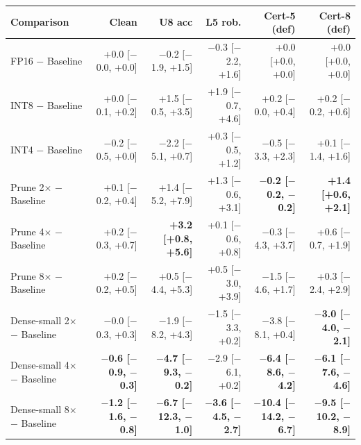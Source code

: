 \begin{tabular}{lrrrrr}
\toprule
Comparison & Clean & U8 acc & L5 rob. & Cert-5 (def) & Cert-8 (def) \\
\midrule
FP16 $-$ Baseline & +0.0 {\scriptsize[$-$0.0, +0.0]} & $-$0.2 {\scriptsize[$-$1.9, +1.5]} & $-$0.3 {\scriptsize[$-$2.2, +1.6]} & +0.0 {\scriptsize[+0.0, +0.0]} & +0.0 {\scriptsize[+0.0, +0.0]} \\
INT8 $-$ Baseline & +0.0 {\scriptsize[$-$0.1, +0.2]} & +1.5 {\scriptsize[$-$0.5, +3.5]} & +1.9 {\scriptsize[$-$0.7, +4.6]} & +0.2 {\scriptsize[$-$0.0, +0.4]} & +0.2 {\scriptsize[$-$0.2, +0.6]} \\
INT4 $-$ Baseline & $-$0.2 {\scriptsize[$-$0.5, +0.0]} & $-$2.2 {\scriptsize[$-$5.1, +0.7]} & +0.3 {\scriptsize[$-$0.5, +1.2]} & $-$0.5 {\scriptsize[$-$3.3, +2.3]} & +0.1 {\scriptsize[$-$1.4, +1.6]} \\
\midrule
Prune 2$\times$ $-$ Baseline & +0.1 {\scriptsize[$-$0.2, +0.4]} & +1.4 {\scriptsize[$-$5.2, +7.9]} & +1.3 {\scriptsize[$-$0.6, +3.1]} & \textbf{$-$0.2 {\scriptsize[$-$0.2, $-$0.2]}} & \textbf{+1.4 {\scriptsize[+0.6, +2.1]}} \\
Prune 4$\times$ $-$ Baseline & +0.2 {\scriptsize[$-$0.3, +0.7]} & \textbf{+3.2 {\scriptsize[+0.8, +5.6]}} & +0.1 {\scriptsize[$-$0.6, +0.8]} & $-$0.3 {\scriptsize[$-$4.3, +3.7]} & +0.6 {\scriptsize[$-$0.7, +1.9]} \\
Prune 8$\times$ $-$ Baseline & +0.2 {\scriptsize[$-$0.2, +0.5]} & +0.5 {\scriptsize[$-$4.4, +5.3]} & +0.5 {\scriptsize[$-$3.0, +3.9]} & $-$1.5 {\scriptsize[$-$4.6, +1.7]} & +0.3 {\scriptsize[$-$2.4, +2.9]} \\
\midrule
Dense-small 2$\times$ $-$ Baseline & $-$0.0 {\scriptsize[$-$0.3, +0.3]} & $-$1.9 {\scriptsize[$-$8.2, +4.3]} & $-$1.5 {\scriptsize[$-$3.3, +0.2]} & $-$3.8 {\scriptsize[$-$8.1, +0.4]} & \textbf{$-$3.0 {\scriptsize[$-$4.0, $-$2.1]}} \\
Dense-small 4$\times$ $-$ Baseline & \textbf{$-$0.6 {\scriptsize[$-$0.9, $-$0.3]}} & \textbf{$-$4.7 {\scriptsize[$-$9.3, $-$0.2]}} & $-$2.9 {\scriptsize[$-$6.1, +0.2]} & \textbf{$-$6.4 {\scriptsize[$-$8.6, $-$4.2]}} & \textbf{$-$6.1 {\scriptsize[$-$7.6, $-$4.6]}} \\
Dense-small 8$\times$ $-$ Baseline & \textbf{$-$1.2 {\scriptsize[$-$1.6, $-$0.8]}} & \textbf{$-$6.7 {\scriptsize[$-$12.3, $-$1.0]}} & \textbf{$-$3.6 {\scriptsize[$-$4.5, $-$2.7]}} & \textbf{$-$10.4 {\scriptsize[$-$14.2, $-$6.7]}} & \textbf{$-$9.5 {\scriptsize[$-$10.2, $-$8.9]}} \\

\end{tabular}
